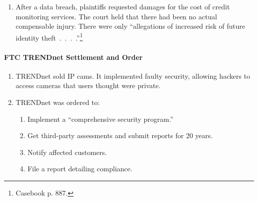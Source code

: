 \begin{enumerate}
    \item After a data breach, plaintiffs requested damages for the cost of 
    credit monitoring services. The court held that there had been no actual 
    compensable injury. There were only ``allegations of increased risk of 
    future identity theft~.~.~.~.''\footnote{Casebook p. 887.}
\end{enumerate}

\paragraph{FTC TRENDnet Settlement and Order}

\begin{enumerate}
    \item TRENDnet sold IP cams. It implemented faulty security, allowing 
    hackers to access cameras that users thought were private.
    \item TRENDnet was ordered to:
    \begin{enumerate}
        \item Implement a ``comprehensive security program.''
        \item Get third-party assessments and submit reports for 20 years.
        \item Notify affected customers.
        \item File a report detailing compliance.
    \end{enumerate}
\end{enumerate}
